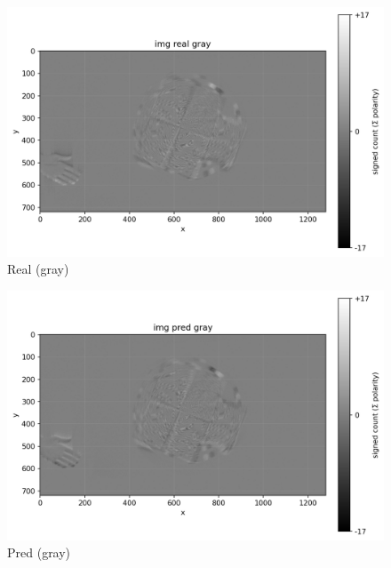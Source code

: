 \begin{figure}[t]
  \centering
  \begin{minipage}[t]{0.32\linewidth}
    \centering
    \includegraphics[width=\linewidth]{images/main_results/window1/img_real_gray.png}\\[-2pt]
    \footnotesize Real (gray)
  \end{minipage}\hfill
  \begin{minipage}[t]{0.32\linewidth}
    \centering
    \includegraphics[width=\linewidth]{images/main_results/window1/img_pred_gray.png}\\[-2pt]
    \footnotesize Pred (gray)
  \end{minipage}\hfill
  \begin{minipage}[t]{0.32\linewidth}
    \centering

\end{minipage}
\end{figure}
